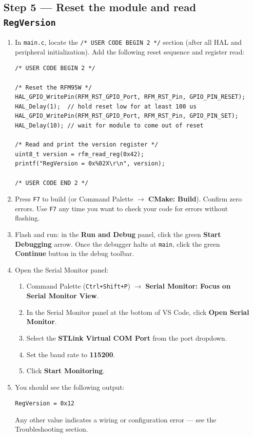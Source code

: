 \documentclass[11pt,letterpaper]{article}
\begin{document}
\subsection{Step 5 --- Reset the module and read \texttt{RegVersion}}
\begin{enumerate}[leftmargin=2em]
	\item In \texttt{main.c}, locate the \texttt{/* USER CODE BEGIN 2 */} section (after all HAL and peripheral initialization). Add the following reset sequence and register read:
\begin{verbatim}
/* USER CODE BEGIN 2 */

/* Reset the RFM95W */
HAL_GPIO_WritePin(RFM_RST_GPIO_Port, RFM_RST_Pin, GPIO_PIN_RESET);
HAL_Delay(1);  // hold reset low for at least 100 us
HAL_GPIO_WritePin(RFM_RST_GPIO_Port, RFM_RST_Pin, GPIO_PIN_SET);
HAL_Delay(10); // wait for module to come out of reset

/* Read and print the version register */
uint8_t version = rfm_read_reg(0x42);
printf("RegVersion = 0x%02X\r\n", version);

/* USER CODE END 2 */
\end{verbatim}
	\item Press \texttt{F7} to build (or Command Palette $\to$ \textbf{CMake: Build}). Confirm zero errors. Use \texttt{F7} any time you want to check your code for errors without flashing.
	\item Flash and run: in the \textbf{Run and Debug} panel, click the green \textbf{Start Debugging} arrow. Once the debugger halts at \texttt{main}, click the green \textbf{Continue} button in the debug toolbar.
	\item Open the Serial Monitor panel:
	\begin{enumerate}[leftmargin=1.5em]
		\item Command Palette (\texttt{Ctrl+Shift+P}) $\to$ \textbf{Serial Monitor: Focus on Serial Monitor View}.
		\item In the Serial Monitor panel at the bottom of VS Code, click \textbf{Open Serial Monitor}.
		\item Select the \textbf{STLink Virtual COM Port} from the port dropdown.
		\item Set the baud rate to \textbf{115200}.
		\item Click \textbf{Start Monitoring}.
	\end{enumerate}
	\item You should see the following output:
\begin{verbatim}
RegVersion = 0x12
\end{verbatim}
	Any other value indicates a wiring or configuration error --- see the Troubleshooting section.
\end{enumerate}
\end{document}
